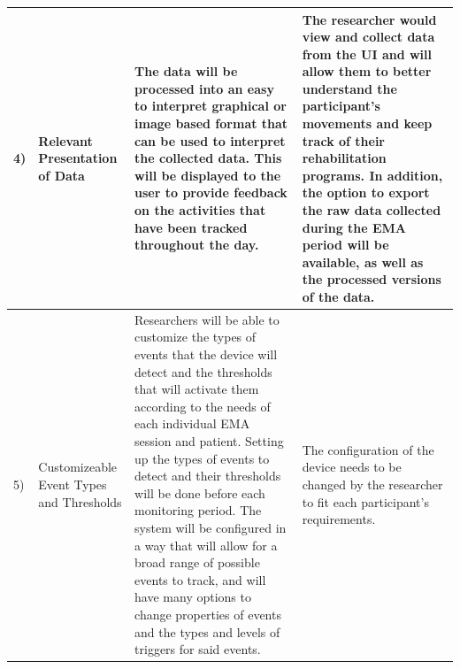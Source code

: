 \documentclass[12pt]{article}
\begin{document}
\begin{center}
\begin{longtable}{| m{2em} | m{7em} | m{16em}| m{14em} | }
        \hline
       4) & Relevant \linebreak Presentation of Data                   & The data will be processed into an easy to interpret graphical or image based format that can be used to interpret the collected data. This will be displayed to the user to provide feedback on the activities that have been tracked throughout the day. & The researcher would view and collect data from the UI and will allow them to better understand the participant's movements and keep track of their rehabilitation programs. In addition, the option to export the raw data collected during the EMA period will be available, as well as the processed versions of the data.                                                                                                                                                                                      \\
	\hline
	5) & Customizeable Event Types and Thresholds			& Researchers will be able to customize the types of events that the device will detect and the thresholds that will activate them according to the needs of each individual EMA session and patient. Setting up the types of events to detect and their thresholds will be done before each monitoring period. The system will be configured in a way that will allow for a broad range of possible events to track, and will have many options to change properties of events and the types and levels of triggers for said events. & The configuration of the device needs to be changed by the researcher to fit each participant's requirements.
\\
        \hline
    \end{longtable}
\end{center}

\pagebreak
\end{document}
